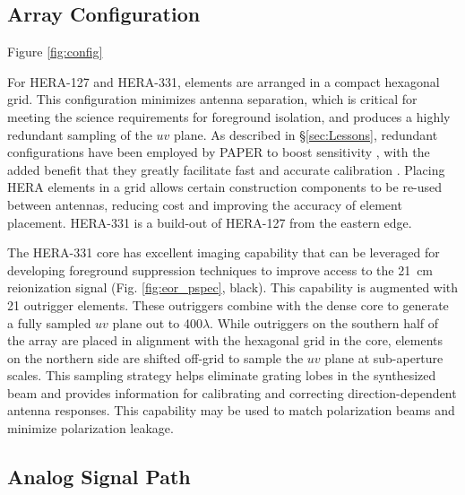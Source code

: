 \documentclass[ars]{/Users/daviddeboer1/Documents/Papers/Copernicus_LaTeX_Package_v_2_7/copernicus}
\begin{document}
\subsection{Array Configuration}

 Figure \ref{fig:config}

For HERA-127 and HERA-331, elements are arranged in a compact hexagonal grid.
This configuration minimizes antenna separation, which is critical for meeting
the science requirements for foreground isolation, and 
produces a highly redundant sampling of the $uv$ plane.  As described in
\S\ref{sec:Lessons}, redundant configurations have been employed by PAPER to
boost sensitivity \citep{parsons_et_al2012a}, with the added benefit that they
greatly facilitate fast and accurate calibration
\citep{liu_et_al2010,parsons_et_al2013}.  Placing HERA elements in a
grid allows certain construction components to be re-used between antennas,
reducing cost and improving the accuracy of element placement.  HERA-331 
is a build-out of HERA-127 from the eastern edge.

The HERA-331 core has excellent
imaging capability that can be leveraged for developing foreground suppression techniques
to improve access to the 21~cm reionization signal 
(Fig. \ref{fig:eor_pspec}, black).
This capability is augmented with 21 outrigger elements.  These outriggers
combine with the dense core to generate a fully
sampled $uv$ plane out to 400$\lambda$.  While outriggers on the southern half of the array are
placed in alignment with the hexagonal grid in the core, elements on the northern side are
shifted off-grid to sample the $uv$ plane at sub-aperture scales.
This sampling strategy helps eliminate grating lobes in the
synthesized beam and provides information for
calibrating and correcting direction-dependent antenna responses.  This capability may
be used to match polarization beams and minimize
polarization leakage.

\subsection{Analog Signal Path}
\end{document}
